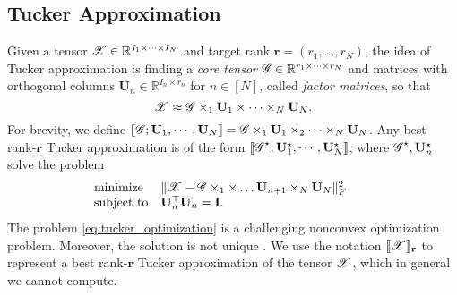 \subsection{Tucker Approximation}
Given a tensor $\T{X}\in\mathbb{R}^{I_1\times \dots \times I_N}$
and target rank $\mathbf{r}=(r_1,\dots, r_N)$,
the idea of Tucker approximation is finding a \emph{core tensor}
$\T{G}\in \mathbb{R}^{r_1 \times \cdots \times r_N}$
and matrices with  orthogonal columns $\mathbf{U}_n \in \mathbb{R}^{I_n \times r_n}$ for $n\in [N]$,
called \emph{factor matrices}, so that
\begin{equation}
\T{X} \approx \T{G}\times_1 \mathbf{U}_1 \times \cdots \times_N \mathbf{U}_N. \nonumber
\end{equation}
For brevity, we define
$\llbracket\T{G}; \mathbf{U}_1, \cdots, \mathbf{U}_N \rrbracket
= \T{G}\times_1 \mathbf{U}_1\times_2 \cdots\times_N \mathbf{U}_N$.
Any best rank-$\mathbf{r}$ Tucker approximation is of the form
$\llbracket\T{G}^\star; \mathbf{U}_1^\star, \cdots, \mathbf{U}_N^\star \rrbracket$,
where $\T{G}^\star, \mathbf{U}_n^\star$ solve the problem
\begin{equation}
\begin{array}{ll}
\label{eq:tucker_optimization}
\mbox{minimize} & \|\T{X} -\T{G}\times_1 \times \dots \mathbf{U}_{n+1} \times_N \mathbf{U}_N\|_F^2 \qquad \\
\mbox{subject to} & \mathbf{U}_n^\top \mathbf{U}_n = \mathbf{I}.
\end{array}
\end{equation}
The problem \ref{eq:tucker_optimization} is a challenging nonconvex optimization problem.
Moreover, the solution is not unique \citep{kolda2009tensor}.
We use the notation $\llbracket\T{X} \rrbracket_\mathbf{r}$
to represent a best rank-$\mathbf{r}$ Tucker approximation of the tensor $\T{X}$,
which in general we cannot compute.

